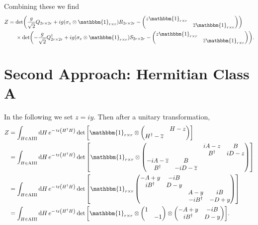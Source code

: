 \documentclass{article}
\begin{document}
Combining these we find
\begin{align*}
    Z &= \det(\frac{g}{\sqrt{2}}Q_{2r\times 2r} + ig(\sigma_z \otimes \mathbbm{1}_{r\times r}) R_{2r\times 2r} - \begin{pmatrix}
        z \mathbbm{1}_{r\times r} & \\
        & \overline{z}  \mathbbm{1}_{r\times r}
    \end{pmatrix}) \\
    &{\phantom{{}={}}} \times \det(-\frac{g}{\sqrt{2}}Q^\dagger_{2r\times 2r} + ig(\sigma_z \otimes \mathbbm{1}_{r\times r}) S_{2r\times 2r} - \begin{pmatrix}
        z  \mathbbm{1}_{r\times r} & \\
        & \overline{z}  \mathbbm{1}_{r\times r}
    \end{pmatrix}).
\end{align*}

\section{Second Approach: Hermitian Class A}

In the following we set $z = iy$.
Then after a unitary transformation,
\begin{align*}
    Z &= \int_{H\in \text{AIII}} \dd{H} e^{-\tr({H^\dagger H})} \det \qty[\mathbbm{1}_{r\times r} \otimes \begin{pmatrix}
        & H - z \\
        H^\dagger - \overline{z} &
    \end{pmatrix}] \\
    &= \int_{H\in \text{AIII}} \dd{H} e^{-\tr({H^\dagger H})} \det \qty[\mathbbm{1}_{r\times r} \otimes \begin{pmatrix}
        & & iA - z & B \\
        & & B^\dagger & iD - z \\
        -iA - \overline{z} & B & & \\
        B^\dagger & -iD - \overline{z} & &
    \end{pmatrix}] \\
    &= \int_{H\in \text{AIII}} \dd{H} e^{-\tr({H^\dagger H})} \det \qty[\mathbbm{1}_{r\times r} \begin{pmatrix}
        -A + y & -iB & & \\
        iB^\dagger & D-y & & \\
        & & A-y & iB \\
        & & -iB^\dagger & -D+y
    \end{pmatrix}] \\
    &= \int_{H\in \text{AIII}} \dd{H} e^{-\tr({H^\dagger H})} \det \qty[\mathbbm{1}_{r\times r} \otimes \begin{pmatrix}
        1 & \\ & -1
    \end{pmatrix} \otimes \begin{pmatrix}
        -A + y & -iB \\
        iB^\dagger & D-y
    \end{pmatrix}].
\end{align*}
\end{document}

